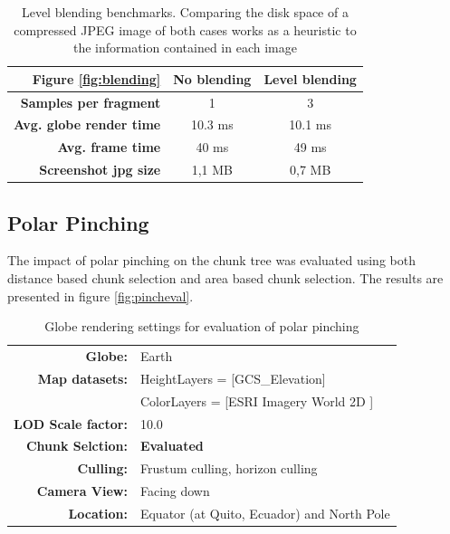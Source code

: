 \begin{table}
\centering
\caption[]{Level blending benchmarks. Comparing the disk space of a compressed JPEG image of both cases works as a heuristic to the information contained in each image}
  \label{table:resultblending}
  \begin{tabular}{| r | c c |}
    \hline
      \textbf{Figure \ref{fig:blending}}  & \textbf{No blending} & \textbf{Level blending} \\ \hline
      \textbf{Samples per fragment} & 1 & 3 \\ 
      \textbf{Avg. globe render time}  & 10.3 ms & 10.1 ms \\ 
      \textbf{Avg. frame time}  & 40 ms &  49 ms \\ 
      \textbf{Screenshot jpg size} & 1,1 MB & 0,7 MB \\
    \hline
  \end{tabular}
\end{table}

\clearpage
\subsection{Polar Pinching}
\label{section:res_polarpinching}
\FloatBarrier
The impact of polar pinching on the chunk tree was evaluated using both distance based chunk selection and area based chunk selection. The results are presented in figure \ref{fig:pincheval}.

\begin{table}[h]
  \centering
  \caption[]{Globe rendering settings for evaluation of polar pinching}
  \label{table:pinchingstart}
  \begin{tabular}{| r l |}
    \hline
      \textbf{Globe:}             & Earth \\
      \textbf{Map datasets:}      & HeightLayers = [GCS\_Elevation\cite{worldelevation3d}] \\
                                  & ColorLayers = [ESRI Imagery World 2D \cite{imageryworld2d}] \\
      \textbf{LOD Scale factor:}  & 10.0 \\
      \textbf{Chunk Selction:}    & \textbf{Evaluated} \\
      \textbf{Culling:}           & Frustum culling, horizon culling \\
      \textbf{Camera View:}       & Facing down\\
      \textbf{Location:}          & Equator (at Quito, Ecuador) and North Pole\\
    \hline
  \end{tabular}
\end{table}

